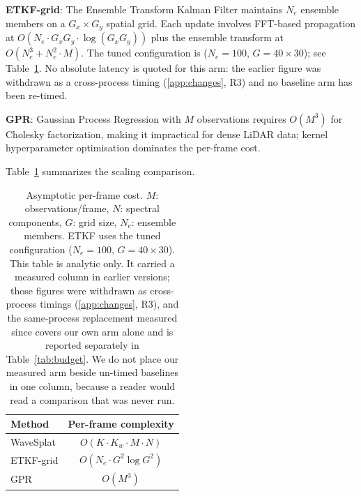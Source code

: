 \documentclass[review]{elsarticle}
\begin{document}
\textbf{ETKF-grid}: The Ensemble Transform Kalman Filter maintains
$N_e$ ensemble members on a $G_x \times G_y$ spatial grid.
Each update involves FFT-based propagation at
$O(N_e \cdot G_x G_y \cdot \log(G_x G_y))$ plus the ensemble
transform at $O(N_e^3 + N_e^2 \cdot M)$. The tuned configuration is
($N_e{=}100$, $G{=}40 \times 30$); see Table~\ref{tab:complexity}.
No absolute latency is quoted for this arm: the earlier figure was withdrawn as a
cross-process timing (\ref{app:changes}, R3) and no baseline arm has been
re-timed.

\textbf{GPR}: Gaussian Process Regression with $M$ observations
requires $O(M^3)$ for Cholesky factorization, making it impractical
for dense LiDAR data; kernel hyperparameter optimisation dominates the per-frame
cost.

Table~\ref{tab:complexity} summarizes the scaling comparison.

\begin{table}[t]
\centering
\caption{Asymptotic per-frame cost.
$M$: observations/frame, $N$: spectral components,
$G$: grid size, $N_e$: ensemble members.
ETKF uses the tuned configuration ($N_e=100$, $G=40\times30$).
This table is analytic only. It carried a measured column in earlier versions; those
figures were withdrawn as cross-process timings (\ref{app:changes}, R3), and the
same-process replacement measured since covers our own arm alone and is reported
separately in Table~\ref{tab:budget}. We do not place our measured arm beside
un-timed baselines in one column, because a reader would read a comparison that was
never run.}
\label{tab:complexity}
\begin{tabular}{lc}
\toprule
Method & Per-frame complexity \\
\midrule
WaveSplat & $O(K \cdot K_w \cdot M \cdot N)$ \\
ETKF-grid & $O(N_e \cdot G^2 \log G^2)$ \\
GPR       & $O(M^3)$ \\
\bottomrule
\end{tabular}
\end{table}
\end{document}
